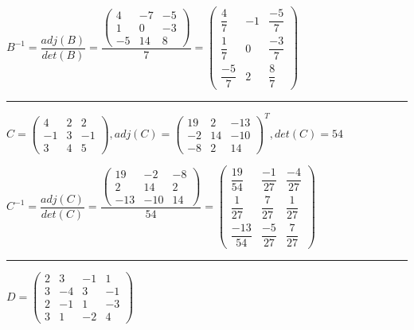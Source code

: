 \documentclass[fleqn]{article}
\begin{document}
\begin{enumerate}
    $B^{-1}= \dfrac{adj(B)}{det(B)}=\dfrac{
      \begin{pmatrix}
        4 & -7 & -5 \\
        1 & 0 & -3 \\
        -5 & 14 & 8
       \end{pmatrix}
    }{7}
    =
    \begin{pmatrix}
      \dfrac{4}{7} & -1 & \dfrac{-5}{7} \\
      \dfrac{1}{7} & 0 & \dfrac{-3}{7} \\
      \dfrac{-5}{7} & 2 & \dfrac{8}{7}
     \end{pmatrix}
    $

    \rule{16cm}{0.4pt}

    $C=
      \begin{pmatrix}
        4 & 2 & 2 \\ 
        -1 & 3 & -1 \\ 
        3 & 4 & 5
      \end{pmatrix}
      ,
      adj(C)=
      \begin{pmatrix}
      19 & 2 & -13 \\
      -2 & 14 & -10 \\
      -8 & 2 & 14
      \end{pmatrix}^T
      ,
      det(C)=54
    $

    $C^{-1}= \dfrac{adj(C)}{det(C)}=\dfrac{
      \begin{pmatrix}
        19 & -2 & -8 \\
        2 & 14 & 2 \\
        -13 & -10 & 14
      \end{pmatrix}
    }{54}
    =
    \begin{pmatrix}
      \dfrac{19}{54} & \dfrac{-1}{27} & \dfrac{-4}{27} \\
      \dfrac{1}{27} & \dfrac{7}{27} & \dfrac{1}{27} \\
      \dfrac{-13}{54} & \dfrac{-5}{27} & \dfrac{7}{27}
    \end{pmatrix}
    $

    \rule{16cm}{0.4pt}


    $D=
      \begin{pmatrix}
        2 & 3 & -1 & 1 \\ 
        3 & -4 & 3 & -1 \\ 
        2 & -1 & 1 & -3 \\ 
        3 & 1 & -2 & 4
      \end{pmatrix}
    $


\end{enumerate}
\end{document}
